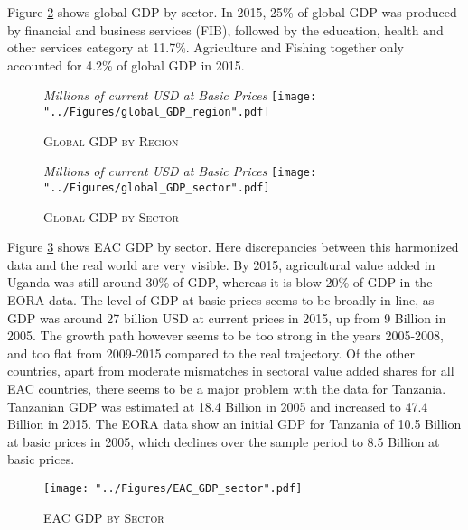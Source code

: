 \documentclass[a4paper]{article}
\begin{document}
Figure \ref{fig:wld_GDP_sec} shows global GDP by sector. In 2015, 25\% of global GDP was produced by financial and business services (FIB), followed by the education, health and other services category at 11.7\%. Agriculture and Fishing together only accounted for 4.2\% of global GDP in 2015.




\begin{figure}[h!]
\centering
\caption{\label{fig:wld_GDP_reg}\textsc{Global GDP by Region}}
\small{\textit{Millions of current USD at Basic Prices}}
\texttt{[image: "../Figures/global\_GDP\_region".pdf]} %
\end{figure}
\FloatBarrier

\begin{figure}[h!]
\centering
\caption{\label{fig:wld_GDP_sec}\textsc{Global GDP by Sector}}
\small{\textit{Millions of current USD at Basic Prices}}
\texttt{[image: "../Figures/global\_GDP\_sector".pdf]} %
\end{figure}
\FloatBarrier

Figure \ref{fig:EAC_GDP_sec} shows EAC GDP by sector. Here discrepancies between this harmonized data and the real world are very visible. By 2015, agricultural value added in Uganda was still around 30\% of GDP, whereas it is blow 20\% of GDP in the EORA data. The level of GDP at basic prices seems to be broadly in line, as GDP was around 27 billion USD at current prices in 2015, up from 9 Billion in 2005. The growth path however seems to be too strong in the years 2005-2008, and too flat from 2009-2015 compared to the real trajectory. Of the other countries, apart from moderate mismatches in sectoral value added shares for all EAC countries, there seems to be a major problem with the data for Tanzania. Tanzanian GDP was estimated at 18.4 Billion in 2005 and increased to 47.4 Billion in 2015. The EORA data show an initial GDP for Tanzania of 10.5 Billion at basic prices in 2005, which declines over the sample period to 8.5 Billion at basic prices. \newline



\begin{figure}[h!]
\centering
\caption{\label{fig:EAC_GDP_sec}\textsc{EAC GDP by Sector}}
\texttt{[image: "../Figures/EAC\_GDP\_sector".pdf]} %
\end{figure}
\FloatBarrier
\end{document}
